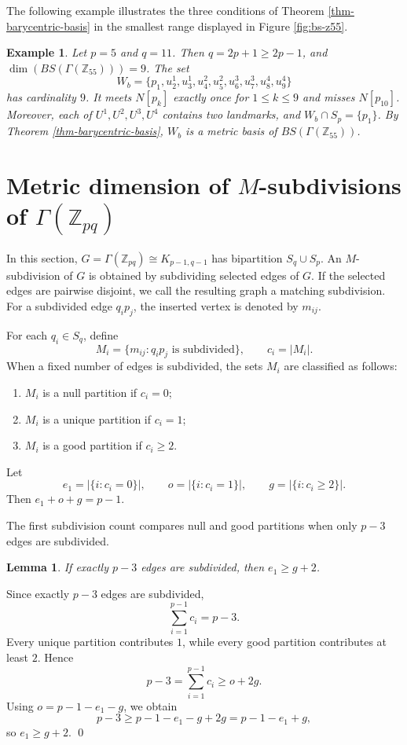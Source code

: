 \documentclass[12pt]{article}
\renewenvironment{proof}{{\bf \noindent Proof.}}{\qed}
\newtheorem{lemma}[theorem]{Lemma}
\newtheorem{example}[theorem]{Example}
\begin{document}
\medskip
\noindent The following example illustrates the three conditions of Theorem \ref{thm-barycentric-basis} in the smallest range displayed in Figure \ref{fig:bs-z55}.
\begin{example}\label{ex-barycentric-z55}
Let $p=5$ and $q=11$. Then $q=2p+1\geq 2p-1$, and $\dim(BS(\Gamma(\mathbb Z_{55})))=9$. The set
$$
W_b=\{p_1,u_2^1,u_3^1,u_4^2,u_5^2,u_6^3,u_7^3,u_8^4,u_9^4\}
$$
has cardinality $9$. It meets $N[p_k]$ exactly once for $1\leq k\leq 9$ and misses $N[p_{10}]$. Moreover, each of $U^1,U^2,U^3,U^4$ contains two landmarks, and $W_b\cap S_p=\{p_1\}$. By Theorem \ref{thm-barycentric-basis}, $W_b$ is a metric basis of $BS(\Gamma(\mathbb Z_{55}))$.
\end{example}

\section{Metric dimension of $M$-subdivisions of $\Gamma(\mathbb Z_{pq})$}\label{sec-m-subdivision}

In this section, $G=\Gamma(\mathbb Z_{pq})\cong K_{p-1,q-1}$ has bipartition $S_q\cup S_p$. An $M$-subdivision of $G$ is obtained by subdividing selected edges of $G$. If the selected edges are pairwise disjoint, we call the resulting graph a matching subdivision. For a subdivided edge $q_ip_j$, the inserted vertex is denoted by $m_{ij}$.

For each $q_i\in S_q$, define
$$
M_i=\{m_{ij}:q_ip_j\text{ is subdivided}\},\qquad c_i=|M_i|.
$$
When a fixed number of edges is subdivided, the sets $M_i$ are classified as follows:
\begin{enumerate}[label=$\mathrm{(\arabic*)}$]
\item $M_i$ is a null partition if $c_i=0$;
\item $M_i$ is a unique partition if $c_i=1$;
\item $M_i$ is a good partition if $c_i\geq 2$.
\end{enumerate}
Let
$$
e_1=|\{i:c_i=0\}|,
\qquad o=|\{i:c_i=1\}|,
\qquad g=|\{i:c_i\geq 2\}|.
$$
Then $e_1+o+g=p-1$.


\medskip
\noindent The first subdivision count compares null and good partitions when only $p-3$ edges are subdivided.
\begin{lemma}\label{lemma-null-count-p3}
If exactly $p-3$ edges are subdivided, then $e_1\geq g+2$.
\end{lemma}

\begin{proof}
Since exactly $p-3$ edges are subdivided,
$$
\sum_{i=1}^{p-1}c_i=p-3.
$$
Every unique partition contributes $1$, while every good partition contributes at least $2$. Hence
$$
p-3=\sum_{i=1}^{p-1}c_i\geq o+2g.
$$
Using $o=p-1-e_1-g$, we obtain
$$
p-3\geq p-1-e_1-g+2g=p-1-e_1+g,
$$
so $e_1\geq g+2$.
\end{proof}
\end{document}

